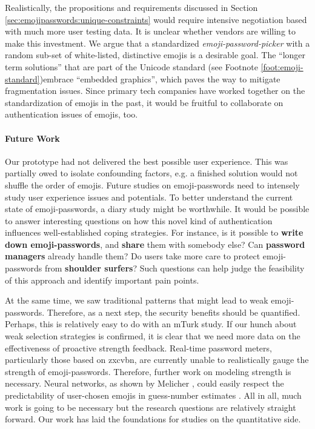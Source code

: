 Realistically, the propositions and requirements discussed in Section \ref{sec:emojipasswords:unique-constraints} would require intensive negotiation based with much more user testing data.  It is unclear whether vendors are willing to make this investment. We argue that a standardized \textit{emoji-password-picker} with a random sub-set of white-listed, distinctive emojis is a desirable goal. The ``longer term solutions'' that are part of the Unicode standard (see Footnote \ref{foot:emoji-standard})embrace ``embedded graphics'', which paves the way to mitigate fragmentation issues. Since primary tech companies have worked together on the standardization of emojis in the past, it would be fruitful to collaborate on authentication issues of emojis, too.

\paragraph{Future Work}
Our prototype had not delivered the best possible user experience. This was partially owed to isolate confounding factors, e.g. a finished solution would not shuffle the order of emojis. Future studies on emoji-passwords need to intensely study user experience issues and potentials. To better understand the current state of emoji-passwords, a diary study might be worthwhile. It would be possible to answer interesting questions on how this novel kind of authentication influences well-established coping strategies. For instance, is it possible to \textbf{write down emoji-passwords}, and \textbf{share} them with somebody else? Can \textbf{password managers} already handle them?  Do users take more care to protect emoji-passwords from \textbf{shoulder surfers}? Such questions can help judge the feasibility of this approach and identify important pain points.

At the same time, we saw traditional patterns that might lead to weak emoji-passwords. Therefore, as a next step, the security benefits should be quantified. Perhaps, this is relatively easy to do with an \gls{mTurk} study. If our hunch about weak selection strategies is confirmed, it is clear that we need more data on the effectiveness of proactive strength feedback. Real-time password meters, particularly those based on zxcvbn, are currently unable to realistically gauge the strength of emoji-passwords. Therefore, further work on modeling strength is necessary. Neural networks, as shown by Melicher \etal, could easily respect the predictability of user-chosen emojis in guess-number estimates \cite{Melicher2016NeuralNetworks}. All in all, much work is going to be necessary but the research questions are relatively straight forward. Our work has laid the foundations for studies on the quantitative side. 

